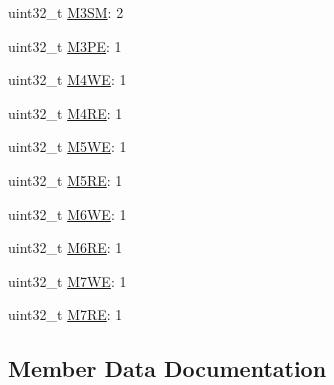 \begin{DoxyCompactItemize}
\item 
uint32\+\_\+t \hyperlink{struct__hw__mpu__rgdaacn_1_1__hw__mpu__rgdaacn__bitfields_a1d5c8e3f717bcefc51847efd1151317a}{M3\+SM}\+: 2
\item 
uint32\+\_\+t \hyperlink{struct__hw__mpu__rgdaacn_1_1__hw__mpu__rgdaacn__bitfields_a52fde37199553970da42cb206ce37096}{M3\+PE}\+: 1
\item 
uint32\+\_\+t \hyperlink{struct__hw__mpu__rgdaacn_1_1__hw__mpu__rgdaacn__bitfields_a57fd5b97c141616eccfd2a9a51214d24}{M4\+WE}\+: 1
\item 
uint32\+\_\+t \hyperlink{struct__hw__mpu__rgdaacn_1_1__hw__mpu__rgdaacn__bitfields_a664d7534bbdd0e750202dc3416152011}{M4\+RE}\+: 1
\item 
uint32\+\_\+t \hyperlink{struct__hw__mpu__rgdaacn_1_1__hw__mpu__rgdaacn__bitfields_acc8b53e8a6535361ad8d690a7142d6d6}{M5\+WE}\+: 1
\item 
uint32\+\_\+t \hyperlink{struct__hw__mpu__rgdaacn_1_1__hw__mpu__rgdaacn__bitfields_a9d873c260ef1bbea33493930ff22a8b7}{M5\+RE}\+: 1
\item 
uint32\+\_\+t \hyperlink{struct__hw__mpu__rgdaacn_1_1__hw__mpu__rgdaacn__bitfields_a44d9bd01fbd19bacac223529c1983ff6}{M6\+WE}\+: 1
\item 
uint32\+\_\+t \hyperlink{struct__hw__mpu__rgdaacn_1_1__hw__mpu__rgdaacn__bitfields_a0c5f96f6100153d066584de8bdc032a9}{M6\+RE}\+: 1
\item 
uint32\+\_\+t \hyperlink{struct__hw__mpu__rgdaacn_1_1__hw__mpu__rgdaacn__bitfields_ac4fe1ddd4e4c31b98f925223264479c1}{M7\+WE}\+: 1
\item 
uint32\+\_\+t \hyperlink{struct__hw__mpu__rgdaacn_1_1__hw__mpu__rgdaacn__bitfields_a01d7cb18b7e907d8c957ee72ae0be251}{M7\+RE}\+: 1
\end{DoxyCompactItemize}


\subsection{Member Data Documentation}

